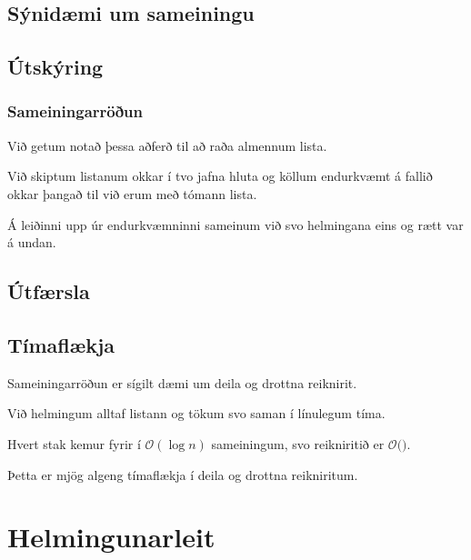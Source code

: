 \subsection{Sýnidæmi um sameiningu}
{
     \mergeA
     \mergeB
     \mergeC
     \mergeD
     \mergeE
     \mergeF
     \mergeG
     \mergeH
     \mergeI
     \mergeJ
     \mergeK
     \mergeL
}

\subsection{Útskýring}
{
    \frametitle{Sameiningarröðun}
    {
        \item<1-> Við getum notað þessa aðferð til að raða almennum lista.
        \item<2-> Við skiptum listanum okkar í tvo jafna hluta og köllum endurkvæmt á fallið okkar þangað til við erum með tómann lista.
        \item<3-> Á leiðinni upp úr endurkvæmninni sameinum við svo helmingana eins og rætt var á undan.
    }
}

\subsection{Útfærsla}
{
}

\subsection{Tímaflækja}
{
    {
        \item<1-> Sameiningarröðun er sígilt dæmi um deila og drottna reiknirit.
        \item<2-> Við helmingum alltaf listann og tökum svo saman í línulegum tíma.
        \item<3-> Hvert stak kemur fyrir í $\mathcal{O}(\log n)$ sameiningum, svo reikniritið er $\mathcal{O}($$)$.
        \item<5-> Þetta er mjög algeng tímaflækja í deila og drottna reikniritum.
    }
}

\section{Helmingunarleit}

